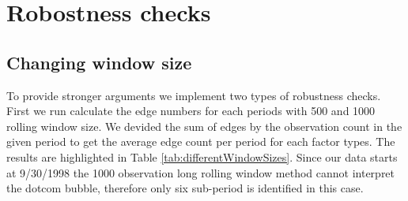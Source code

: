\documentclass[12pt,bibliography=totoc]{article}
\begin{document}




\section{Robostness checks}

\subsection{Changing window size}

To provide stronger arguments we implement two types of robustness checks. First we run calculate the edge numbers for each periods with 500 and 1000 rolling window size. We devided the sum of edges by the observation count in the given period to get the average edge count per period for each factor types. The results are highlighted in Table \ref{tab:differentWindowSizes}. Since our data starts at 9/30/1998 the 1000 observation long rolling window method cannot interpret the dotcom bubble, therefore only six sub-period is identified in this case. 
\end{document}
